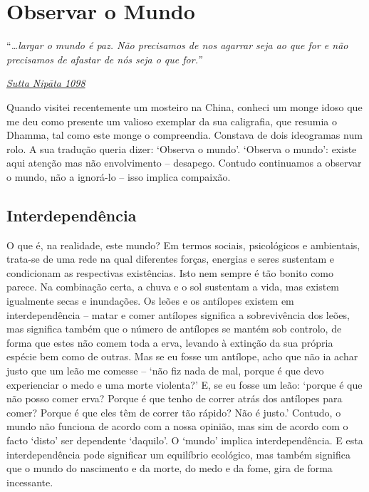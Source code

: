 \chapter{Observar o Mundo}

``\emph{\ldots{}largar o mundo é paz. Não precisamos de nos agarrar seja ao que for e não precisamos de afastar de nós seja o que for.''}

\href{https://suttacentral.net/snp5.12/en/sujato}{\emph{Sutta Nipāta 1098}}

Quando visitei recentemente um mosteiro na China, conheci um monge idoso que me deu como presente um valioso exemplar da sua caligrafia, que resumia o Dhamma, tal como este monge o compreendia. Constava de dois ideogramas num rolo. A sua tradução queria dizer: `Observa o mundo'. `Observa o mundo': existe aqui atenção mas não envolvimento -- desapego. Contudo continuamos a observar o mundo, não a ignorá-lo -- isso implica compaixão.

\section{Interdependência}

O que é, na realidade, este mundo? Em termos sociais, psicológicos e ambientais, trata-se de uma rede na qual diferentes forças, energias e seres sustentam e condicionam as respectivas existências. Isto nem sempre é tão bonito como parece. Na combinação certa, a chuva e o sol sustentam a vida, mas existem igualmente secas e inundações. Os leões e os antílopes existem em interdependência -- matar e comer antílopes significa a sobrevivência dos leões, mas significa também que o número de antílopes se mantém sob controlo, de forma que estes não comem toda a erva, levando à extinção da sua própria espécie bem como de outras. Mas se eu fosse um antílope, acho que não ia achar justo que um leão me comesse -- `não fiz nada de mal, porque é que devo experienciar o medo e uma morte violenta?' E, se eu fosse um leão: `porque é que não posso comer erva? Porque é que tenho de correr atrás dos antílopes para comer? Porque é que eles têm de correr tão rápido? Não é justo.' Contudo, o mundo não funciona de acordo com a nossa opinião, mas sim de acordo com o facto `disto' ser dependente `daquilo'. O `mundo' implica interdependência. E esta interdependência pode significar um equilíbrio ecológico, mas também significa que o mundo do nascimento e da morte, do medo e da fome, gira de forma incessante.

